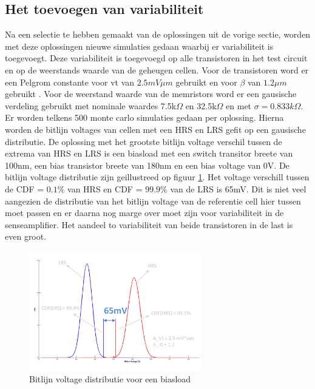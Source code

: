 \subsection{Het toevoegen van variabiliteit}\label{sec:varload}
Na een selectie te hebben gemaakt van de oplossingen uit de vorige sectie, worden met deze oplossingen nieuwe simulaties gedaan waarbij er variabiliteit is toegevoegt. Deze variabiliteit is toegevoegd op alle transistoren in het test circuit en op de weerstands waarde van de geheugen cellen. Voor de transistoren word er een Pelgrom constante voor vt van $2.5mV\mu m$ gebruikt en voor $\beta$ van $1.2\mu m$ gebruikt \cite{ppt:variatie}. Voor de weerstand waarde van de memristors word er een gausische verdeling gebruikt met nominale waardes 7.5k$\Omega$ en 32.5k$\Omega$ en met $\sigma = 0.833k\Omega$. Er worden telkens 500 monte carlo simulaties gedaan per oplossing. Hierna worden de bitlijn voltages van cellen met een HRS en LRS gefit op een gausische distributie. De oplossing met het grootste bitlijn voltage verschil tussen de extrema van HRS en LRS is een biasload met een switch transitor breete van 100nm, een bias transistor breete van 180nm en een bias voltage van 0V. De bitlijn voltage distributie zijn geillustreed op figuur \ref{fig:distbias}. Het voltage verschill tussen de CDF = $0.1\%$ van HRS en CDF = $99.9\%$ van de LRS is 65mV. Dit is niet veel aangezien de distributie van het bitlijn voltage van de referentie cell hier tussen moet passen en er daarna nog marge over moet zijn voor variabiliteit in de senseamplifier. Het aandeel to variabiliteit van beide transistoren in de last is even groot.

\begin{figure}[!ht]
  \centering
  \includegraphics[width=0.67\textwidth]{../fig/hfdst-last-var1.png}
  \caption{Bitlijn voltage distributie voor een biasload}
  \label{fig:distbias}
\end{figure}

